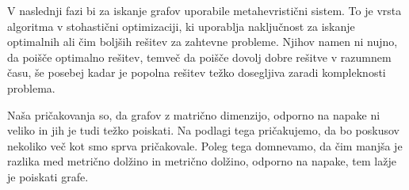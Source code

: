 \documentclass[a4paper,10pt, fleqn]{article}
\begin{document}
V naslednji fazi bi za iskanje grafov uporabile metahevristični sistem. To je vrsta algoritma v 
stohastični optimizaciji, ki uporablja naključnost za iskanje optimalnih ali čim boljših 
rešitev za zahtevne probleme. Njihov namen ni nujno, da poišče optimalno rešitev, temveč 
da poišče dovolj dobre rešitve v razumnem času, še posebej kadar je popolna rešitev težko dosegljiva
zaradi kompleknosti problema.

Naša pričakovanja so, da grafov z matrično dimenzijo, odporno na napake ni veliko in jih je tudi 
težko poiskati. Na podlagi tega pričakujemo, da bo poskusov nekoliko več kot smo sprva pričakovale.
Poleg tega domnevamo, da čim manjša je razlika med metrično dolžino in metrično dolžino, odporno na 
napake, tem lažje je poiskati grafe. 
\end{document}
